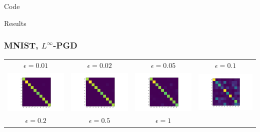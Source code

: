 \documentclass[10pt,usepdftitle=false,aspectratio=169]{beamer}
\begin{document}
\begin{frame}
	\huge Code
\end{frame}

\begin{frame}
	\huge Results
\end{frame}

\begin{frame}
	\frametitle{MNIST, $L^\infty$-PGD}
	\begin{tabular}{cccc}
		
		$\epsilon = 0.01$  & 	$\epsilon = 0.02$ & 	$\epsilon = 0.05$ & 	$\epsilon = 0.1$ \\
		
		\includegraphics[align=c,width=0.3\columnwidth]{../code/results/MNIST/figures/LinfPGD, epsilon=0.01.png} &
		\includegraphics[align=c,width=0.3\columnwidth]{../code/results/MNIST/figures/LinfPGD, epsilon=0.02.png} &
		\includegraphics[align=c,width=0.3\columnwidth]{../code/results/MNIST/figures/LinfPGD, epsilon=0.05.png} &
		\includegraphics[align=c,width=0.3\columnwidth]{../code/results/MNIST/figures/LinfPGD, epsilon=0.1.png} 
		\bigskip \\
		
		$\epsilon = 0.2$  & 	$\epsilon = 0.5$ & 	$\epsilon = 1$ & \\
		

\end{tabular}
\end{frame}
\end{document}
